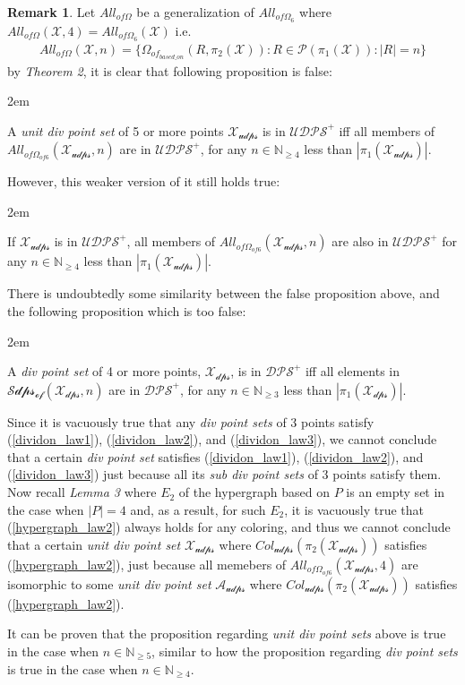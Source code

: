 \documentclass[11pt, oneside]{article}      %
\newcommand{\proposition}[1]{
\begin{addmargin}[2em]{2em}
\vspace{5px}
#1
\vspace{5px}
\end{addmargin}}
\theoremstyle{definition}
\numberwithin{equation}{section}
\newtheorem*{remark}{Remark}
\newcommand{\reff}[1]{(\ref{#1})}
\theoremstyle{c}
\begin{document}
\begin{remark} Let $All_{of\Omega}$ be a generalization of $All_{of \Omega_{6}}$ where $All_{of\Omega}(\mathscr{X},4) = All_{of\Omega_{6}}(\mathscr{X})$ i.e.
\begin{align}
All_{of\Omega}(\mathscr{X},n) = \{ \Omega_{of_{based\_on}}(R, \pi_2(\mathscr{X})) : R \in \mathcal{P}(\pi_1(\mathscr{X})) : |R| = n \}
\end{align}
by \textit{Theorem 2}, it is clear that following proposition is false:
\proposition{
A \textit{unit div point set} of 5 or more points $\mathscr{X_{udps}}$ is in $\mathscr{UDPS}^+$ iff all members of $All_{of\Omega_{of 6}}(\mathscr{X_{udps}},n)$ are in $\mathscr{UDPS}^+$, for any $n \in \mathbb{N}_{\geq 4}$ less than $|\pi_1(\mathscr{X_{udps}})|$.
}
However, this weaker version of it still holds true:
\proposition{
If $\mathscr{X_{udps}}$ is in $\mathscr{UDPS}^+$, all members of  $All_{of\Omega_{of 6}}(\mathscr{X_{udps}},n)$ are also in $\mathscr{UDPS}^+$ for any $n \in \mathbb{N}_{\geq 4}$ less than $|\pi_1(\mathscr{X_{udps}})|$.
}
There is undoubtedly some similarity between the false proposition above, and the following proposition which is too false:
\proposition{
A \textit{div point set} of 4 or more points, $\mathscr{X_{dps}}$, is in $\mathscr{DPS}^+$ iff all elements in $\mathscr{Sdps_{of}}(\mathscr{X_{dps}},n)$ are in $\mathscr{DPS}^+$, for any $n \in \mathbb{N}_{\geq 3}$ less than $|\pi_1(\mathscr{X_{dps}})|$.
}
Since it is vacuously true that any \textit{div point sets} of 3 points satisfy \reff{dividon_law1}, \reff{dividon_law2}, and \reff{dividon_law3}, we cannot conclude that a certain \textit{div point set} satisfies \reff{dividon_law1}, \reff{dividon_law2}, and \reff{dividon_law3} just because all its \textit{sub div point sets} of 3 points satisfy them. Now recall \textit{Lemma 3} where $E_2$ of the hypergraph based on $P$ is an empty set in the case when $|P|=4$ and, as a result, for such $E_2$, it is vacuously true that \reff{hypergraph_law2} always holds for any coloring, and thus we cannot conclude that a certain \textit{unit div point set} $\mathscr{X_{udps}}$ where $Col_{\mathscr{udps}}(\pi_2(\mathscr{X_{udps}}))$ satisfies \reff{hypergraph_law2}, just because all memebers of $All_{of\Omega_{of 6}}(\mathscr{X_{udps}},4)$ are isomorphic to some \textit{unit div point set} $\mathscr{A_{udps}}$ where $Col_{\mathscr{udps}}(\pi_2(\mathscr{X_{udps}}))$ satisfies  \reff{hypergraph_law2}.

It can be proven that the proposition regarding \textit{unit div point sets} above is true in the case when $n \in \mathbb{N}_{\geq 5}$, similar to how the proposition regarding \textit{div point sets} is true in the case when $n \in \mathbb{N}_{\geq 4}$.
\end{remark}
\end{document}
